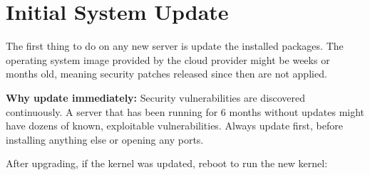 \setcounter{section}{1}
\section{Initial System Update}\label{21-system-setup:212-initial-system-update}

The first thing to do on any new server is update the installed packages. The operating system image provided by the cloud provider might be weeks or months old, meaning security patches released since then are not applied.

\begin{codebox}[short]

\begin{Shaded}
\begin{Highlighting}[]



\end{Highlighting}
\end{Shaded}

\end{codebox}

\noindent{}\textbf{Why update immediately:}
Security vulnerabilities are discovered continuously. A server that has been running for 6 months without updates might have dozens of known, exploitable vulnerabilities. Always update first, before installing anything else or opening any ports.

After upgrading, if the kernel was updated, reboot to run the new kernel:

\begin{codebox}[short]

\begin{Shaded}
\begin{Highlighting}[]
\OperatorTok{\textgreater{}}\KeywordTok{\&\&}   \KeywordTok{||}  


\end{Highlighting}
\end{Shaded}

\end{codebox}

